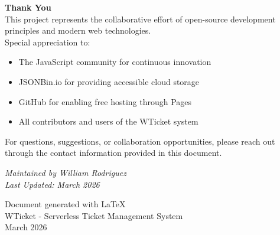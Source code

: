 \documentclass[12pt,a4paper]{report}
\begin{document}
\vspace*{3cm}

\begin{center}
{\color{blue!70!black}\Huge\textbf{Thank You}}\\[1cm]

{\Large
This project represents the collaborative effort of open-source development principles and modern web technologies.}\\[1cm]

{\large
Special appreciation to:}\\[0.5cm]

\begin{itemize}
    \itemsep0.5em
    \item The JavaScript community for continuous innovation
    \item JSONBin.io for providing accessible cloud storage
    \item GitHub for enabling free hosting through Pages
    \item All contributors and users of the WTicket system
\end{itemize}

\vfill

{\large
For questions, suggestions, or collaboration opportunities, please reach out through the contact information provided in this document.}

\vspace{2cm}

{\color{gray}\textit{Maintained by William Rodriguez}}\\[0.3cm]
{\color{gray}\textit{Last Updated: March 2026}}

\end{center}

\newpage
\thispagestyle{empty}
\begin{center}
\vspace*{\fill}
{\LARGE\sffamily\color{blue!70!black}Document generated with LaTeX}\\
\vspace{1cm}
{\large\sffamily\color{gray}WTicket - Serverless Ticket Management System}\\
\vspace{0.5cm}
{\large\sffamily\color{gray}March 2026}
\vspace*{\fill}
\end{center}
\end{document}
